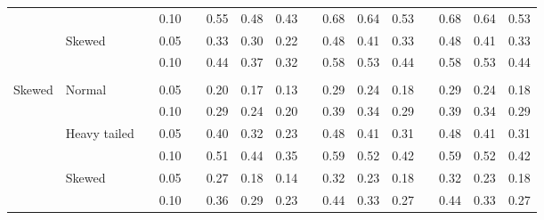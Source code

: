 \documentclass[12pt]{article} %
\begin{document}
\begin{table}[ht]
\begin{scriptsize}
\begin{center}
\begin{tabular}{ll p{.1cm} c p{.1cm} rrr p{.1cm} rrr p{.1cm} rrr}
             &              && 0.10 &&   0.55 & 0.48 & 0.43 && 0.68 & 0.64 & 0.53 && 0.68 & 0.64 & 0.53 \\ 
             & Skewed       && 0.05 &&   0.33 & 0.30 & 0.22 && 0.48 & 0.41 & 0.33 && 0.48 & 0.41 & 0.33 \\ 
             &              && 0.10 &&   0.44 & 0.37 & 0.32 && 0.58 & 0.53 & 0.44 && 0.58 & 0.53 & 0.44 \\
             &&&&&&&&&&&&&&&\\ 
Skewed       & Normal       && 0.05 &&   0.20 & 0.17 & 0.13 && 0.29 & 0.24 & 0.18 && 0.29 & 0.24 & 0.18 \\ 
             &              && 0.10 &&   0.29 & 0.24 & 0.20 && 0.39 & 0.34 & 0.29 && 0.39 & 0.34 & 0.29 \\ 
             & Heavy tailed && 0.05 &&   0.40 & 0.32 & 0.23 && 0.48 & 0.41 & 0.31 && 0.48 & 0.41 & 0.31 \\ 
             &              && 0.10 &&   0.51 & 0.44 & 0.35 && 0.59 & 0.52 & 0.42 && 0.59 & 0.52 & 0.42 \\ 
             & Skewed       && 0.05 &&   0.27 & 0.18 & 0.14 && 0.32 & 0.23 & 0.18 && 0.32 & 0.23 & 0.18 \\ 
             &              && 0.10 &&   0.36 & 0.29 & 0.23 && 0.44 & 0.33 & 0.27 && 0.44 & 0.33 & 0.27 \\ 


\end{tabular}
\end{center}
\end{scriptsize}
\end{table}
\end{document}
